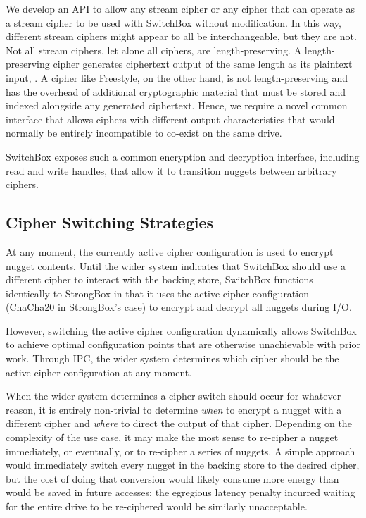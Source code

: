 
We develop an API to allow any stream cipher or any cipher that can operate as a
stream cipher to be used with SwitchBox without modification. In this way,
different stream ciphers might appear to all be interchangeable, but they are
not. Not all stream ciphers, let alone all ciphers, are length-preserving. A
length-preserving cipher generates ciphertext output of the same length as its
plaintext input, . A cipher like Freestyle, on the other hand, is
not length-preserving and has the overhead of additional cryptographic material
that must be stored and indexed alongside any generated ciphertext. Hence, we
require a novel common interface that allows ciphers with different output
characteristics that would normally be entirely incompatible to co-exist on the
same drive.

SwitchBox exposes such a common encryption and decryption interface, including
read and write handles, that allow it to transition nuggets between arbitrary
ciphers.

\subsection{Cipher Switching Strategies}

At any moment, the currently active cipher configuration is used to encrypt
nugget contents. Until the wider system indicates that SwitchBox should use a
different cipher to interact with the backing store, SwitchBox functions
identically to StrongBox in that it uses the active cipher configuration
(ChaCha20 in StrongBox's case) to encrypt and decrypt all nuggets during I/O.

However, switching the active cipher configuration dynamically allows SwitchBox
to achieve optimal configuration points that are otherwise unachievable with
prior work. Through IPC, the wider system determines which cipher should be the
active cipher configuration at any moment.

When the wider system determines a cipher switch should occur for whatever
reason, it is entirely non-trivial to determine \emph{when} to encrypt a nugget
with a different cipher and \emph{where} to direct the output of that cipher.
Depending on the complexity of the use case, it may make the most sense to
re-cipher a nugget immediately, or eventually, or to re-cipher a series of
nuggets. A simple approach would immediately switch every nugget in the backing
store to the desired cipher, but the cost of doing that conversion would likely
consume more energy than would be saved in future accesses; the egregious
latency penalty incurred waiting for the entire drive to be re-ciphered would be
similarly unacceptable.

